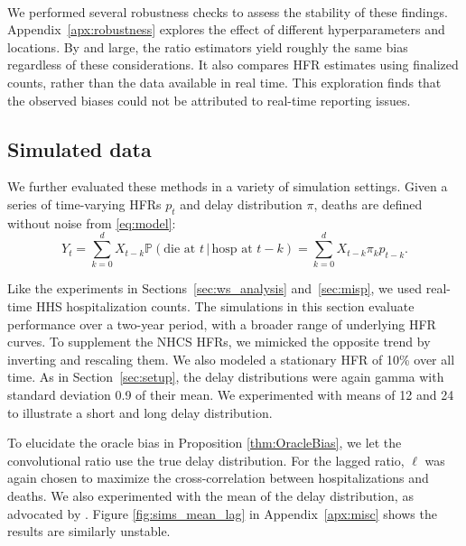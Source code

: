 \documentclass{article}
\newcommand{\given}{\, \vert \,}
\begin{document}
\paragraph{}

We performed several robustness checks to assess the stability of these findings. Appendix~\ref{apx:robustness} explores the effect of different hyperparameters and locations. By and large, the ratio estimators yield roughly the same bias regardless of these considerations. It also compares HFR estimates using finalized counts, rather than the data available in real time. This exploration finds that the observed biases could not be attributed to real-time reporting issues. 

\subsection{Simulated data}\label{sec:results_sim}

We further evaluated these methods in a variety of simulation settings. Given a series of time-varying HFRs $p_t$ and delay distribution $\pi$, deaths are defined without noise from \eqref{eq:model}:
$$Y_t = \sum_{k=0}^d X_{t-k} \mathbb{P}(\text{die at $t$}\given\text{hosp at }t-k) = \sum_{k=0}^d X_{t-k} \pi_k p_{t-k}.$$

Like the experiments in Sections~\ref{sec:ws_analysis} and~\ref{sec:misp}, we
used real-time HHS hospitalization counts. The simulations in this
section evaluate performance over a two-year period, with a broader range of
underlying HFR curves. To supplement the NHCS HFRs, we mimicked the opposite
trend by inverting and rescaling them. We also modeled a stationary HFR of 10\%
over all time. As in Section~\ref{sec:setup}, the delay distributions were again
gamma with standard deviation 0.9 of their mean. We experimented with means of
12 and 24 to illustrate a short and long delay distribution. 

To elucidate the oracle bias in Proposition \ref{thm:OracleBias}, we let the convolutional ratio use the true delay distribution. For the lagged ratio, $\ell$ was again chosen to maximize the cross-correlation between hospitalizations and deaths. We also experimented with the mean of the delay distribution, as advocated by \citet{lagged_chinese}. Figure \ref{fig:sims_mean_lag} in Appendix~\ref{apx:misc} shows the results are similarly unstable.
\end{document}
